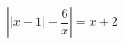 \begin{ex}[type=equation]
	\begin{condition}
		$\left|\big | x -1\big|-\dfrac{6}{x}\right| = x+2$
	\end{condition}
\end{ex}